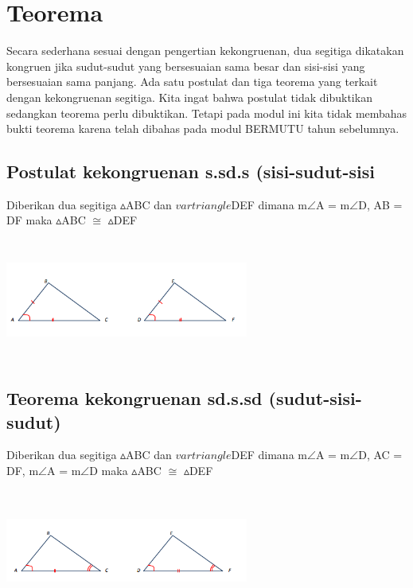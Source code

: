 \documentclass[11pt,fleqn]{book} %
\begin{document}
\section{Teorema}

Secara sederhana sesuai dengan pengertian kekongruenan, dua segitiga dikatakan
kongruen jika sudut-sudut yang bersesuaian sama besar dan sisi-sisi yang bersesuaian
sama panjang. Ada satu postulat dan tiga teorema yang terkait dengan kekongruenan
segitiga. Kita ingat bahwa postulat tidak dibuktikan sedangkan teorema perlu
dibuktikan. Tetapi pada modul ini kita tidak membahas bukti teorema karena telah
dibahas pada modul BERMUTU tahun sebelumnya. 

\subsection{Postulat kekongruenan s.sd.s (sisi-sudut-sisi}


\begin{theorem}

Diberikan dua segitiga $\vartriangle $ABC dan $vartriangle $DEF dimana m$\angle$A = m$\angle$D, AB = DF maka $\vartriangle $ABC $\cong$ $\vartriangle $DEF
\end{theorem}
\includegraphics[width = 8cm, height= 4cm]{Pictures/4.png}
\subsection{Teorema kekongruenan sd.s.sd (sudut-sisi-sudut)}
\begin{theorem}
Diberikan dua segitiga $\vartriangle $ABC dan $vartriangle $DEF dimana m$\angle$A = m$\angle$D, AC = DF, m$\angle$A = m$\angle$D maka $\vartriangle $ABC $\cong$ $\vartriangle $DEF
\end{theorem}
\includegraphics[width = 8cm, height= 4cm]{Pictures/5.png}
\end{document}
